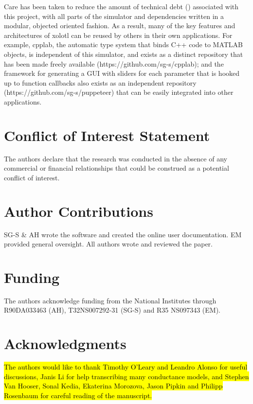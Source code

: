 \documentclass{frontiersSCNS} %
\begin{document}
Care has been taken to reduce the amount of technical debt (\cite{suryanarayana2014refactoring}) associated with this project, with all parts of the simulator and dependencies written in a modular, objected oriented fashion. As a result, many of the key features and architectures of xolotl can be reused by others in their own applications. For example, cpplab, the automatic type system that binds C++ code to MATLAB objects, is independent of this simulator, and exists as a distinct repository that has been made freely available (https://github.com/sg-s/cpplab); and the framework for generating a GUI with sliders for each parameter that is hooked up to function callbacks also exists as an independent repository (https://github.com/sg-s/puppeteer) that can be easily integrated into other applications.


%
%
%
%
%
%

\section*{Conflict of Interest Statement}

The authors declare that the research was conducted in the absence of any commercial or financial relationships that could be construed as a potential conflict of interest.

\section*{Author Contributions}

SG-S \& AH wrote the software and created the online user documentation. EM provided general oversight. All authors wrote and reviewed the paper.

\section*{Funding}

The authors acknowledge funding from the National Institutes through R90DA033463 (AH), T32NS007292-31 (SG-S) and R35 NS097343 (EM).


\section*{Acknowledgments}
\hl{The authors would like to thank Timothy O'Leary and Leandro Alonso for useful discussions, Janis Li for help transcribing many conductance models, and Stephen Van Hooser, Sonal Kedia, Ekaterina Morozova, Jason Pipkin and Philipp Rosenbaum for careful reading of the manuscript.}
\end{document}

